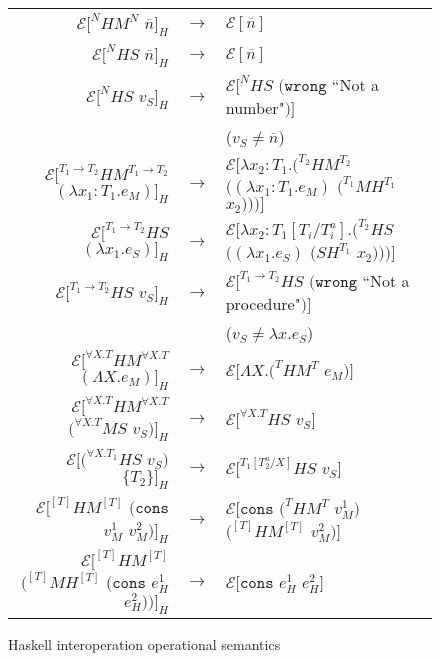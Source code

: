 \begin{figure}
\label{hios}
\caption{Haskell interoperation operational semantics}
\begin{center}
\begin{tabular}{rcl}
$\mathscr{E}[^{N}HM^{N}$ $\overline{n}]_{H}$ & $\rightarrow$ & $\mathscr{E}[\overline{n}]$ \\
$\mathscr{E}[^{N}HS$ $\overline{n}]_{H}$ & $\rightarrow$ & $\mathscr{E}[\overline{n}]$ \\
$\mathscr{E}[^{N}HS$ $v_{S}]_{H}$ & $\rightarrow$ & $\mathscr{E}[^{N}HS$ $(\mathtt{wrong}$ ``Not a number"$)]$ \\
&& ($v_{S}\neq\overline{n}$) \\
$\mathscr{E}[^{T_{1}\rightarrow T_{2}}HM^{T_{1}\rightarrow T_{2}}$ $(\lambda x_{1}:T_{1}.e_{M})]_{H}$ & $\rightarrow$ & $\mathscr{E}[\lambda x_{2}:T_{1}.(^{T_{2}}HM^{T_{2}}$ $((\lambda x_{1}:T_{1}.e_{M})$ $(^{T_{1}}MH^{T_{1}}$ $x_{2})))]$ \\
$\mathscr{E}[^{T_{1}\rightarrow T_{2}}HS$ $(\lambda x_{1}.e_{S})]_{H}$ & $\rightarrow$ & $\mathscr{E}[\lambda x_{2}:T_{1}[T_{i}/T^{a}_{i}].(^{T_{2}}HS$ $((\lambda x_{1}.e_{S})$ $(SH^{T_{1}}$ $x_{2})))]$ \\
$\mathscr{E}[^{T_{1}\rightarrow T_{2}}HS$ $v_{S}]_{H}$ & $\rightarrow$ & $\mathscr{E}[^{T_{1}\rightarrow T_{2}}HS$ $(\mathtt{wrong}$ ``Not a procedure"$)]$ \\
&& ($v_{S}\neq\lambda x.e_{S}$) \\
$\mathscr{E}[^{\forall X.T}HM^{\forall X.T}$ $(\Lambda X.e_{M})]_{H}$ & $\rightarrow$ & $\mathscr{E}[\Lambda X.(^{T}HM^{T}$ $e_{M})]$ \\
$\mathscr{E}[^{\forall X.T}HM^{\forall X.T}$ $(^{\forall X.T}MS$ $v_{S})]_{H}$ & $\rightarrow$ & $\mathscr{E}[^{\forall X.T}HS$ $v_{S}]$ \\
$\mathscr{E}[(^{\forall X.T_{1}}HS$ $v_{S})$ $\lbrace T_{2}\rbrace]_{H}$ & $\rightarrow$ & $\mathscr{E}[^{T_{1}[T^{a}_{2}/X]}HS$ $v_{S}]$ \\
$\mathscr{E}[^{[T]}HM^{[T]}$ $(\mathtt{cons}$ $v_{M}^{1}$ $v_{M}^{2})]_{H}$ & $\rightarrow$ & $\mathscr{E}[\mathtt{cons}$ $(^{T}HM^{T}$ $v_{M}^{1})$ $(^{[T]}HM^{[T]}$ $v_{M}^{2})]$ \\
$\mathscr{E}[^{[T]}HM^{[T]}$ $(^{[T]}MH^{[T]}$ $(\mathtt{cons}$ $e_{H}^{1}$ $e_{H}^{2}))]_{H}$ & $\rightarrow$ & $\mathscr{E}[\mathtt{cons}$ $e_{H}^{1}$ $e_{H}^{2}]$ \\

\end{tabular}
\end{center}
\end{figure}
